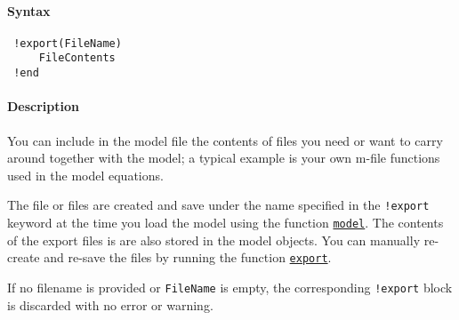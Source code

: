 


	\paragraph{Syntax}
 
 \begin{verbatim}
 !export(FileName)
     FileContents
 !end
 \end{verbatim}
 
 \paragraph{Description}
 
 You can include in the model file the contents of files you need or want
 to carry around together with the model; a typical example is your own
 m-file functions used in the model equations.
 
 The file or files are created and save under the name specified in the
 \texttt{!export} keyword at the time you load the model using the
 function \href{model/model}{\texttt{model}}. The contents of the export
 files is are also stored in the model objects. You can manually
 re-create and re-save the files by running the function
 \href{model/export}{\texttt{export}}.
 
 If no filename is provided or \texttt{FileName} is empty, the
 corresponding \texttt{!export} block is discarded with no error or
 warning.


